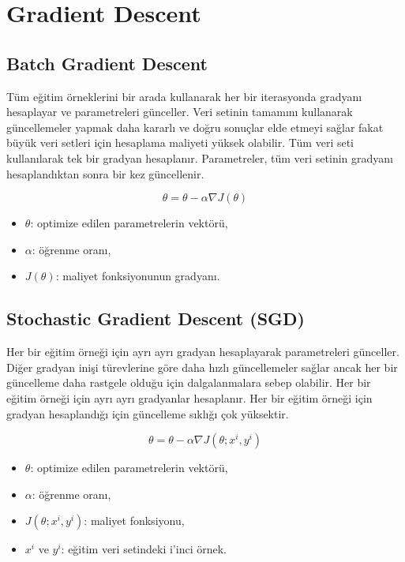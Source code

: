 \section{Gradient Descent}
\subsection{Batch Gradient Descent}
Tüm eğitim örneklerini bir arada kullanarak her bir iterasyonda gradyanı hesaplayar ve parametreleri günceller. Veri setinin tamamını kullanarak güncellemeler yapmak daha kararlı ve doğru sonuçlar elde etmeyi sağlar fakat büyük veri setleri için hesaplama maliyeti yüksek olabilir. Tüm veri seti kullanılarak tek bir gradyan hesaplanır. Parametreler, tüm veri setinin gradyanı hesaplandıktan sonra bir kez güncellenir.

\[\theta = \theta - \alpha \nabla J(\theta)\]
\begin{itemize}
	\item $\theta$: optimize edilen parametrelerin vektörü,
	\item $\alpha$: öğrenme oranı,
	\item $J(\theta)$: maliyet fonksiyonunun gradyanı.
\end{itemize}

\newpage

\subsection{Stochastic Gradient Descent (SGD)}
Her bir eğitim örneği için ayrı ayrı gradyan hesaplayarak parametreleri günceller. Diğer gradyan inişi türevlerine göre daha hızlı güncellemeler sağlar ancak her bir güncelleme daha rastgele olduğu için dalgalanmalara sebep olabilir. Her bir eğitim örneği için ayrı ayrı gradyanlar hesaplanır. Her bir eğitim örneği için gradyan hesaplandığı için güncelleme sıklığı çok yüksektir.

\[\theta = \theta - \alpha \nabla J(\theta; x^{i}, y^{i} )\]
\begin{itemize}
	\item $\theta$: optimize edilen parametrelerin vektörü,
	\item $\alpha$: öğrenme oranı,
	\item $J(\theta; x^{i}, y^{i} )$: maliyet fonksiyonu,
	\item $x^{i}$ ve $y^{i}$: eğitim veri setindeki i'inci örnek.
\end{itemize}

\newpage

